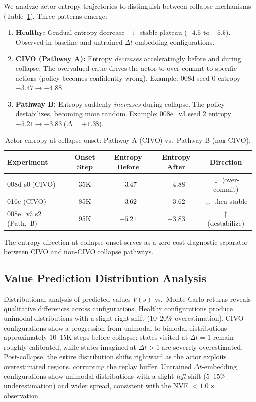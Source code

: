 \documentclass[10pt,letterpaper]{article}
\newcommand{\dt}{\Delta t}
\begin{document}
We analyze actor entropy trajectories to distinguish between collapse mechanisms (Table~\ref{tab:entropy}).
Three patterns emerge:

\begin{enumerate}[nosep,leftmargin=*]
  \item \textbf{Healthy:} Gradual entropy decrease $\to$ stable plateau ($-4.5$ to $-5.5$). Observed in baseline and untrained $\dt$-embedding configurations.
  \item \textbf{CIVO (Pathway A):} Entropy \emph{decreases} acceleratingly before and during collapse. The overvalued critic drives the actor to over-commit to specific actions (policy becomes confidently wrong). Example: 008d seed 0 entropy $-3.47 \to -4.88$.
  \item \textbf{Pathway B:} Entropy suddenly \emph{increases} during collapse. The policy destabilizes, becoming more random. Example: 008e\_v3 seed 2 entropy $-5.21 \to -3.83$ ($\Delta = +1.38$).
\end{enumerate}

\begin{table}[h]
\centering
\caption{Actor entropy at collapse onset: Pathway A (CIVO) vs.\ Pathway B (non-CIVO).}
\label{tab:entropy}
\small
\begin{tabular}{lcccc}
\toprule
Experiment & Onset Step & Entropy Before & Entropy After & Direction \\
\midrule
008d s0 (CIVO)       & 35K & $-3.47$ & $-4.88$ & $\downarrow$ (over-commit) \\
016e (CIVO)          & 85K & $-3.62$ & $-3.62$ & $\downarrow$ then stable \\
008e\_v3 s2 (Path.\ B) & 95K & $-5.21$ & $-3.83$ & $\uparrow$ (destabilize) \\
\bottomrule
\end{tabular}
\end{table}

The entropy direction at collapse onset serves as a zero-cost diagnostic separator between CIVO and non-CIVO collapse pathways.

\subsection{Value Prediction Distribution Analysis}
\label{sec:vdist}

Distributional analysis of predicted values $V(s)$ vs.\ Monte Carlo returns reveals qualitative differences across configurations.
Healthy configurations produce unimodal distributions with a slight right shift ($10$--$20\%$ overestimation).
CIVO configurations show a progression from unimodal to bimodal distributions approximately $10$--$15$K steps before collapse: states visited at $\dt{=}1$ remain roughly calibrated, while states imagined at $\dt{>}1$ are severely overestimated.
Post-collapse, the entire distribution shifts rightward as the actor exploits overestimated regions, corrupting the replay buffer.
Untrained $\dt$-embedding configurations show unimodal distributions with a slight \emph{left} shift ($5$--$15\%$ underestimation) and wider spread, consistent with the NVE $< 1.0\times$ observation.
\end{document}
